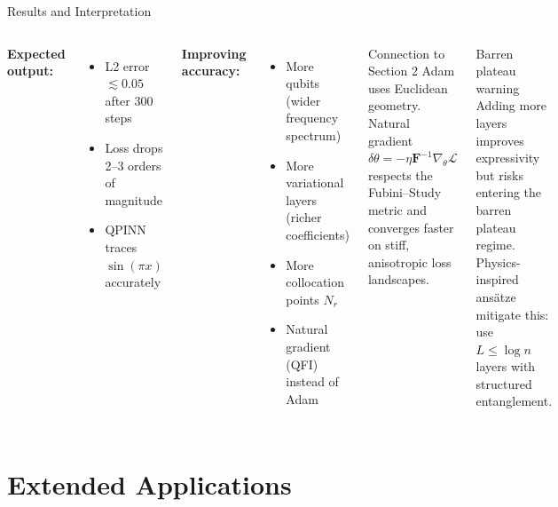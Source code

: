 \documentclass[aspectratio=169,11pt]{beamer}
\newcommand{\QFI}{\mathbf{F}}
\begin{document}
\begin{frame}{Results and Interpretation}
  \begin{columns}[T]
    \textbf{Expected output:}
    \begin{itemize}\itemsep1pt
      \item L2 error $\lesssim 0.05$ after 300 steps
      \item Loss drops 2--3 orders of magnitude
      \item QPINN traces $\sin(\pi x)$ accurately
    \end{itemize}
    \textbf{Improving accuracy:}
    \begin{itemize}\itemsep1pt
      \item More qubits (wider frequency spectrum)
      \item More variational layers (richer coefficients)
      \item More collocation points $N_r$
      \item Natural gradient (QFI) instead of Adam
    \end{itemize}

    \begin{block}{Connection to Section 2}
      Adam uses Euclidean geometry.
      Natural gradient
      $\delta\theta = -\eta\QFI^{-1}\nabla_\theta\mathcal{L}$
      respects the Fubini--Study metric and converges faster
      on stiff, anisotropic loss landscapes.
    \end{block}
    \begin{alertblock}{Barren plateau warning}
      Adding more layers improves expressivity but risks
      entering the barren plateau regime.
      Physics-inspired ans\"atze mitigate this: use
      $L \leq \log n$ layers with structured entanglement.
    \end{alertblock}
  \end{columns}
\end{frame}

\section{Extended Applications}
\end{document}

